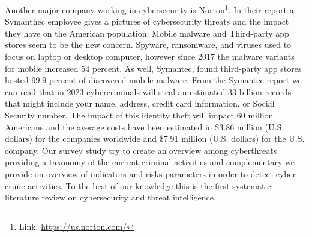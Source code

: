 Another major company working in cybersecurity is Norton\footnote{Link: \href{}{https://us.norton.com/}}. In their report \cite{norton} a Symanthec employee gives a pictures of cybersecurity threats and the impact they have on the American population. Mobile malware and Third-party app stores seem to be the new concern. Spyware, ransomware, and viruses used to focus on laptop or desktop computer, however since 2017 the malware variants for mobile increased 54 percent. As well, Symantec, found third-party app stores hosted 99.9 percent of discovered mobile malware. From the Symantec report we can read that in 2023 cybercriminals will steal an estimated 33 billion records that might include your name, address, credit card information, or Social Security number. The impact of this identity theft will impact 60 million Americans and the average costs have been estimated in \$3.86 million (U.S. dollars) for the companies worldwide and \$7.91 million (U.S. dollars) for the U.S. company.
Our survey study try to create an overview among cyberthreats providing a taxonomy of the current criminal activities and complementary we provide on overview of indicators and risks parameters in order to detect cyber crime activities. To the best of our knowledge this is the first systematic literature review on cybersecurity and threat intelligence.

